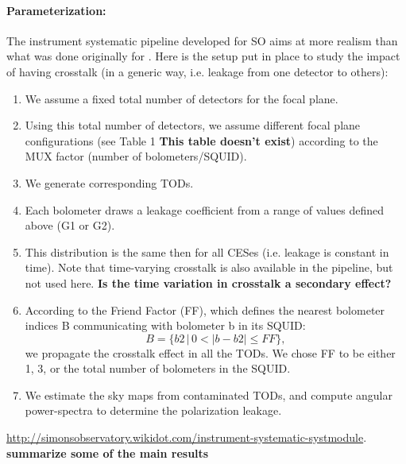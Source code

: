\paragraph{Parameterization:}
The instrument systematic pipeline developed for SO aims at more realism than what was done originally for \pb. 
Here is the setup put in place to study the impact of having crosstalk (in a generic way, i.e. leakage from one detector to others):
\begin{enumerate}
\item{We assume a fixed total number of detectors for the focal plane.}
\item{Using this total number of detectors, we assume different focal plane configurations (see Table 1 \textbf{This table doesn't exist}) according to the MUX factor (number of bolometers/SQUID).}
\item{We generate corresponding TODs.}
\item{Each bolometer draws a leakage coefficient from a range of values defined above (G1 or G2).}
\item{This distribution is the same then for all CESes (i.e. leakage is constant in time). Note that time-varying crosstalk is also available in the pipeline, but not used here. \textbf{Is the time variation in crosstalk a secondary effect?}}
\item{According to the Friend Factor (FF), which defines the nearest bolometer indices B communicating with bolometer b in its SQUID: 
\begin{equation}
B = \{ b2\, |\, 0 < |b-b2| \leq FF \},
\end{equation} 
we propagate the crosstalk effect in all the TODs. We chose FF to be either 1, 3, or the total number of bolometers in the SQUID.}
\item{We estimate the sky maps from contaminated TODs, and compute angular power-spectra to determine the polarization leakage.}
\end{enumerate}
\url{http://simonsobservatory.wikidot.com/instrument-systematic-systmodule}.
\textbf{summarize some of the main results}

